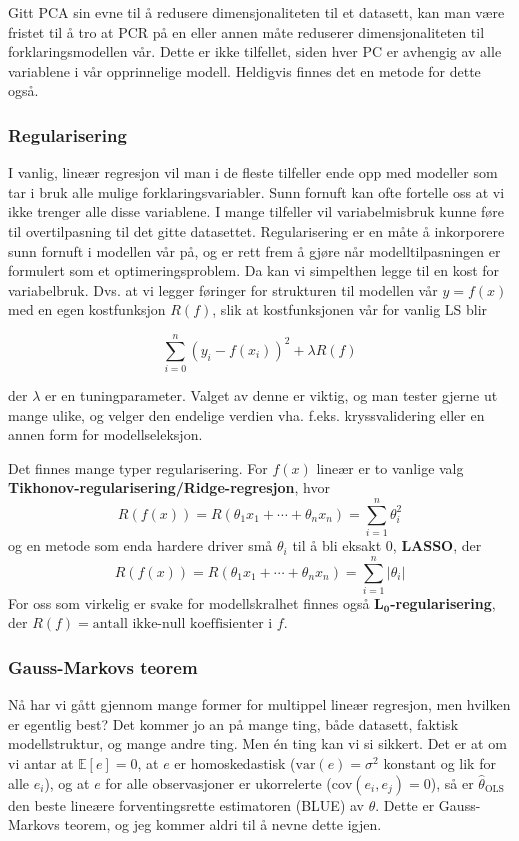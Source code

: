 Gitt PCA sin evne til å redusere dimensjonaliteten til et datasett, kan man være fristet til å tro at PCR på en eller annen måte reduserer dimensjonaliteten til forklaringsmodellen vår. Dette er ikke tilfellet, siden hver PC er avhengig av alle variablene i vår opprinnelige modell. Heldigvis finnes det en metode for dette også.

\subsubsection{Regularisering}
I vanlig, lineær regresjon vil man i de fleste tilfeller ende opp med modeller som tar i bruk alle mulige forklaringsvariabler. Sunn fornuft kan ofte fortelle oss at vi ikke trenger alle disse variablene. I mange tilfeller vil variabelmisbruk kunne føre til overtilpasning til det gitte datasettet. Regularisering er en måte å inkorporere sunn fornuft i modellen vår på, og er rett frem å gjøre når modelltilpasningen er formulert som et optimeringsproblem. Da kan vi simpelthen legge til en kost for variabelbruk. Dvs. at vi legger føringer for strukturen til modellen vår $y = f(x)$ med en egen kostfunksjon $R(f)$, slik at kostfunksjonen vår for vanlig LS blir

\begin{equation}
	\sum_{i=0}^{n}(y_i - f(x_i))^2 + \lambda R(f)
\end{equation}

der $\lambda$ er en tuningparameter. Valget av denne er viktig, og man tester gjerne ut mange ulike, og velger den endelige verdien vha. f.eks. kryssvalidering eller en annen form for modellseleksjon.

Det finnes mange typer regularisering. For $f(x)$ lineær er to vanlige valg \textbf{Tikhonov-regularisering/Ridge-regresjon}, hvor 
\begin{equation}
	R(f(x)) = R(\theta_1 x_1 + \cdots + \theta_n x_n) = \sum_{i = 1}^n \theta_i^2
\end{equation}
og en metode som enda hardere driver små $\theta_i$ til å bli eksakt 0, \textbf{LASSO}, der
\begin{equation}
	R(f(x)) = R(\theta_1 x_1 + \cdots + \theta_n x_n) = \sum_{i = 1}^n | \theta_i |
\end{equation}
For oss som virkelig er svake for modellskralhet finnes også \textbf{$\mathbf{L_0}$-regularisering}, der $R(f) = \textrm{antall ikke-null koeffisienter i } f$.

\subsubsection{Gauss-Markovs teorem}
Nå har vi gått gjennom mange former for multippel lineær regresjon, men hvilken er egentlig best? Det kommer jo an på mange ting, både datasett, faktisk modellstruktur, og mange andre ting. Men én ting kan vi si sikkert. Det er at om vi antar at $\mathbb{E}[e] = 0$, at $e$ er homoskedastisk ($\textrm{var}(e) = \sigma^2$ konstant og lik for alle $e_i$), og at $e$ for alle observasjoner er ukorrelerte ($\textrm{cov}(e_i, e_j) = 0$), så er $\hat{\theta}_\textrm{OLS}$ den beste lineære forventingsrette estimatoren (BLUE) av $\theta$. Dette er Gauss-Markovs teorem, og jeg kommer aldri til å nevne dette igjen.
